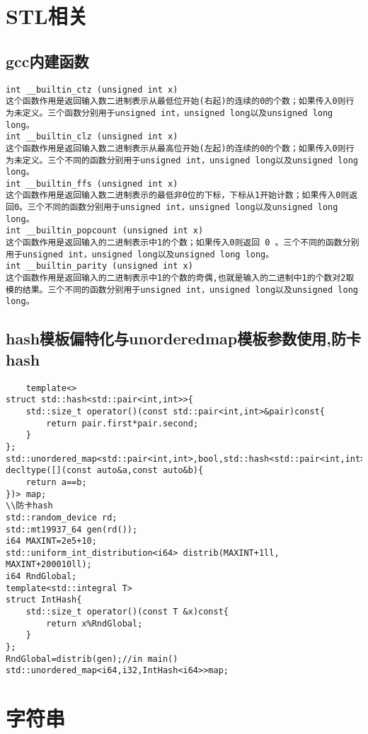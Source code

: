 \documentclass[UTF8]{ctexart}
\begin{document}
\section{STL相关}
\subsection{gcc内建函数}
\begin{lstlisting}
int __builtin_ctz (unsigned int x)
这个函数作用是返回输入数二进制表示从最低位开始(右起)的连续的0的个数；如果传入0则行为未定义。三个函数分别用于unsigned int，unsigned long以及unsigned long long。
int __builtin_clz (unsigned int x)
这个函数作用是返回输入数二进制表示从最高位开始(左起)的连续的0的个数；如果传入0则行为未定义。三个不同的函数分别用于unsigned int，unsigned long以及unsigned long long。
int __builtin_ffs (unsigned int x)
这个函数作用是返回输入数二进制表示的最低非0位的下标，下标从1开始计数；如果传入0则返回0。三个不同的函数分别用于unsigned int，unsigned long以及unsigned long long。
int __builtin_popcount (unsigned int x)
这个函数作用是返回输入的二进制表示中1的个数；如果传入0则返回 0 。三个不同的函数分别用于unsigned int，unsigned long以及unsigned long long。
int __builtin_parity (unsigned int x)
这个函数作用是返回输入的二进制表示中1的个数的奇偶,也就是输入的二进制中1的个数对2取模的结果。三个不同的函数分别用于unsigned int，unsigned long以及unsigned long long。
\end{lstlisting}
\subsection{hash模板偏特化与unorderedmap模板参数使用,防卡hash}
\begin{lstlisting}
    template<>
struct std::hash<std::pair<int,int>>{
    std::size_t operator()(const std::pair<int,int>&pair)const{
        return pair.first*pair.second;
    }
};
std::unordered_map<std::pair<int,int>,bool,std::hash<std::pair<int,int>>, decltype([](const auto&a,const auto&b){
    return a==b;
})> map;
\\防卡hash
std::random_device rd;
std::mt19937_64 gen(rd());
i64 MAXINT=2e5+10;
std::uniform_int_distribution<i64> distrib(MAXINT+1ll, MAXINT+200010ll);
i64 RndGlobal;
template<std::integral T>
struct IntHash{
    std::size_t operator()(const T &x)const{
        return x%RndGlobal;
    }
};
RndGlobal=distrib(gen);//in main()
std::unordered_map<i64,i32,IntHash<i64>>map;
\end{lstlisting}
\section{字符串}
\end{document}

